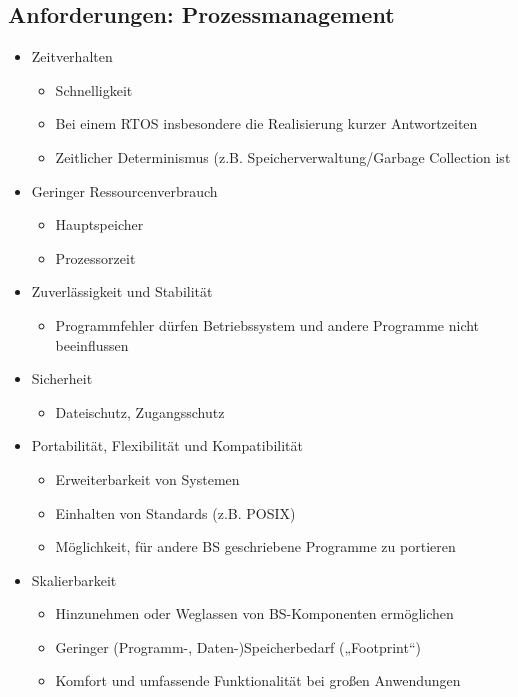 \subsection{Anforderungen: Prozessmanagement}
\begin{itemize}
	\item Zeitverhalten
	\begin{itemize}
		\item Schnelligkeit
		\item Bei einem RTOS insbesondere die Realisierung kurzer Antwortzeiten
		\item Zeitlicher Determinismus (z.B. Speicherverwaltung/Garbage Collection ist
	\end{itemize}
	
	\item Geringer Ressourcenverbrauch
	\begin{itemize}
		\item Hauptspeicher
		\item Prozessorzeit
	\end{itemize}
	
	\item Zuverlässigkeit und Stabilität
	\begin{itemize}
		\item Programmfehler dürfen Betriebssystem und andere Programme nicht beeinflussen
	\end{itemize}
	
	\item Sicherheit
	\begin{itemize}
		\item Dateischutz, Zugangsschutz
	\end{itemize}
	
	\item Portabilität, Flexibilität und Kompatibilität
	\begin{itemize}
		\item Erweiterbarkeit von Systemen
		\item Einhalten von Standards (z.B. POSIX)
		\item Möglichkeit, für andere BS geschriebene Programme zu portieren
	\end{itemize}
	
	\item Skalierbarkeit
	\begin{itemize}
		\item Hinzunehmen oder Weglassen von BS-Komponenten ermöglichen
		\item Geringer (Programm-, Daten-)Speicherbedarf („Footprint“)
		\item Komfort und umfassende Funktionalität bei großen Anwendungen
	\end{itemize}
\end{itemize}

